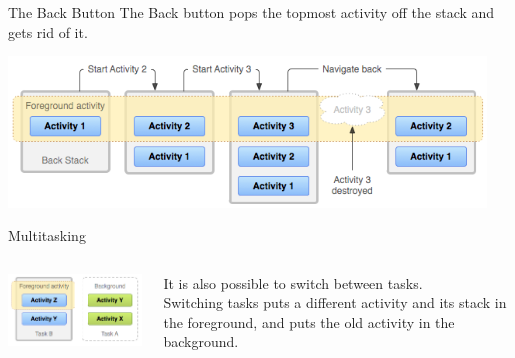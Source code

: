 \documentclass[aspectratio=169]{beamer}
\begin{document}
\begin{frame}{The Back Button}
\large
The Back button pops the topmost activity off the stack and gets rid of it. \\
\vspace{1em}
\begin{center}
\includegraphics[width=0.95\textwidth]{img/diagram_backstack.png}
\end{center}
\end{frame}



\begin{frame}{Multitasking}
\begin{columns}
\begin{column}{0.6\textwidth}
\begin{center}
\includegraphics[height=0.6\textheight]{img/diagram_multitasking.png}
\end{center}
\end{column}
\begin{column}{0.4\textwidth}
It is also possible to switch between tasks. \\
\vspace{1em}
Switching tasks puts a different activity and its stack
in the foreground, and puts the old activity in the background.
\end{column}
\end{columns}
\end{frame}
\end{document}
